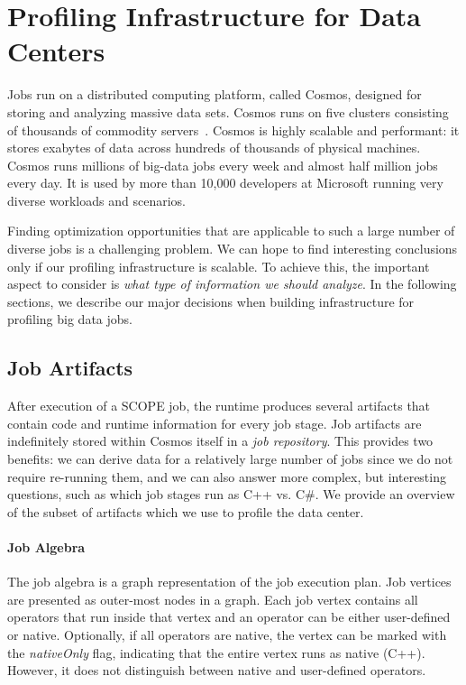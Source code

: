 \section{Profiling Infrastructure for Data Centers}
Jobs run on a distributed computing platform, called Cosmos, designed for storing and analyzing massive data sets. Cosmos runs on five clusters consisting of thousands of commodity servers~\cite{SCOPE}. Cosmos is highly scalable and performant: it stores exabytes of data across hundreds of thousands of physical machines. Cosmos runs millions of big-data jobs every week and almost half million jobs every day. It is used by more than 10,000 developers at Microsoft running very diverse workloads and scenarios.

Finding optimization opportunities that are applicable to such a large number of diverse jobs is a challenging problem.
We can hope to find interesting conclusions only if our profiling infrastructure is scalable. To achieve this, the important aspect to consider is \emph{what type of information we should analyze}. In the following sections, we describe our major decisions when building infrastructure for profiling big data jobs.

\subsection{Job Artifacts}
\label{sec:artifacts}

After execution of a SCOPE job, the runtime produces several artifacts that contain code and runtime information for every job stage.
Job artifacts are indefinitely stored within Cosmos itself in a {\em job repository}.
This provides two benefits: we can derive data for a relatively large number of jobs since we do not require re-running them, and we can also answer more complex, but interesting questions, such as which job stages run as C++ vs. C\#.
We provide an overview of the subset of artifacts which we use to profile the data center.

\paragraph{Job Algebra}

The job algebra is a graph representation of the job execution plan. Job vertices are presented as outer-most nodes in a graph. Each job vertex contains all operators that run inside that vertex and an operator can be either user-defined or native. Optionally, if all operators are native, the vertex can be marked with the \emph{nativeOnly} flag, indicating that the entire vertex runs as native (C++). However, it does not distinguish between native and user-defined operators.


